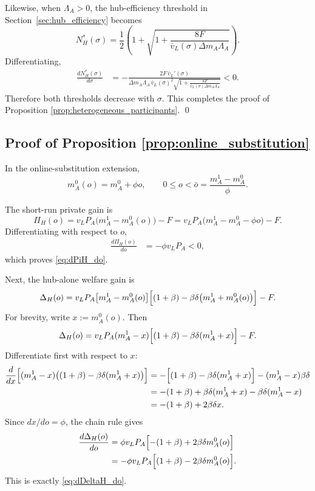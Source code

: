 Likewise, when $\Lambda_A>0$, the hub-efficiency threshold in Section~\ref{sec:hub_efficiency} becomes
\begin{equation}
N_H^*(\sigma)
=
\frac{1}{2}
\left(
1+\sqrt{1+\frac{8F}{\bar v_L(\sigma)\Delta m_A\Lambda_A}}
\right).
\label{eq:app7_NH_sigma}
\end{equation}
Differentiating,
\begin{align}
\frac{dN_H^*(\sigma)}{d\sigma}
&=
-\frac{2F\,\bar v_L'(\sigma)}
{\Delta m_A\Lambda_A\,\bar v_L(\sigma)^2
\sqrt{1+\frac{8F}{\bar v_L(\sigma)\Delta m_A\Lambda_A}}}
<0.
\label{eq:app7_dNH_dsigma}
\end{align}
Therefore both thresholds decrease with $\sigma$. This completes the proof of Proposition \ref{prop:heterogeneous_participants}.
\qed

\subsection{Proof of Proposition \ref{prop:online_substitution}}

In the online-substitution extension,
\[
m_A^0(o)=m_A^0+\phi o,
\qquad
0\le o<\bar o=\frac{m_A^1-m_A^0}{\phi}.
\]

The short-run private gain is
\[
\Pi_H(o)
=
v_LP_A\bigl(m_A^1-m_A^0(o)\bigr)-F
=
v_LP_A\bigl(m_A^1-m_A^0-\phi o\bigr)-F.
\]
Differentiating with respect to $o$,
\begin{align}
\frac{d\Pi_H(o)}{do}
&=
-\phi v_LP_A<0,
\label{eq:app7_dPiH_do_raw}
\end{align}
which proves \eqref{eq:dPiH_do}.

Next, the hub-alone welfare gain is
\[
\Delta_H(o)
=
v_LP_A\bigl[m_A^1-m_A^0(o)\bigr]
\Bigl[(1+\beta)-\beta\delta\bigl(m_A^1+m_A^0(o)\bigr)\Bigr]-F.
\]
For brevity, write $x:=m_A^0(o)$. Then
\[
\Delta_H(o)=v_LP_A(m_A^1-x)\Bigl[(1+\beta)-\beta\delta(m_A^1+x)\Bigr]-F.
\]
Differentiate first with respect to $x$:
\begin{align}
\frac{d}{dx}\Bigl[(m_A^1-x)\bigl((1+\beta)-\beta\delta(m_A^1+x)\bigr)\Bigr]
&=
-\Bigl[(1+\beta)-\beta\delta(m_A^1+x)\Bigr]
-(m_A^1-x)\beta\delta
\nonumber\\
&=
-(1+\beta)+\beta\delta(m_A^1+x)-\beta\delta(m_A^1-x)
\nonumber\\
&=
-(1+\beta)+2\beta\delta x.
\label{eq:app7_chain_x}
\end{align}
Since $dx/do=\phi$, the chain rule gives
\begin{align}
\frac{d\Delta_H(o)}{do}
&=
\phi v_LP_A\Bigl[-(1+\beta)+2\beta\delta m_A^0(o)\Bigr]
\nonumber\\
&=
-\phi v_LP_A\Bigl[(1+\beta)-2\beta\delta m_A^0(o)\Bigr].
\label{eq:app7_dDeltaH_do_raw}
\end{align}
This is exactly \eqref{eq:dDeltaH_do}.

